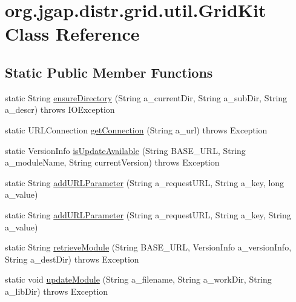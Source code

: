 \hypertarget{classorg_1_1jgap_1_1distr_1_1grid_1_1util_1_1_grid_kit}{\section{org.\-jgap.\-distr.\-grid.\-util.\-Grid\-Kit Class Reference}
\label{classorg_1_1jgap_1_1distr_1_1grid_1_1util_1_1_grid_kit}
}
\subsection*{Static Public Member Functions}
\begin{DoxyCompactItemize}
\item 
static String \hyperlink{classorg_1_1jgap_1_1distr_1_1grid_1_1util_1_1_grid_kit_ad245f01a5b8aa750211ce00883c40872}{ensure\-Directory} (String a\-\_\-current\-Dir, String a\-\_\-sub\-Dir, String a\-\_\-descr)  throws I\-O\-Exception 
\item 
static U\-R\-L\-Connection \hyperlink{classorg_1_1jgap_1_1distr_1_1grid_1_1util_1_1_grid_kit_a8062e8bcddcfc8bc012cdd2cfb15ee52}{get\-Connection} (String a\-\_\-url)  throws Exception 
\item 
static Version\-Info \hyperlink{classorg_1_1jgap_1_1distr_1_1grid_1_1util_1_1_grid_kit_a7ed064739e97dbc91ad4cd11ac736864}{is\-Update\-Available} (String B\-A\-S\-E\-\_\-\-U\-R\-L, String a\-\_\-module\-Name, String current\-Version)  throws Exception 
\item 
static String \hyperlink{classorg_1_1jgap_1_1distr_1_1grid_1_1util_1_1_grid_kit_a7d39c73e9c09a06e3410094b3b8853de}{add\-U\-R\-L\-Parameter} (String a\-\_\-request\-U\-R\-L, String a\-\_\-key, long a\-\_\-value)
\item 
static String \hyperlink{classorg_1_1jgap_1_1distr_1_1grid_1_1util_1_1_grid_kit_ace870d11c157aeceaebc7f6c8790177a}{add\-U\-R\-L\-Parameter} (String a\-\_\-request\-U\-R\-L, String a\-\_\-key, String a\-\_\-value)
\item 
static String \hyperlink{classorg_1_1jgap_1_1distr_1_1grid_1_1util_1_1_grid_kit_a97462ca055f86ee6bb121f879202c0bf}{retrieve\-Module} (String B\-A\-S\-E\-\_\-\-U\-R\-L, Version\-Info a\-\_\-version\-Info, String a\-\_\-dest\-Dir)  throws Exception 
\item 
static void \hyperlink{classorg_1_1jgap_1_1distr_1_1grid_1_1util_1_1_grid_kit_a61d160ee177cb0b07e5e5fda371ad48f}{update\-Module} (String a\-\_\-filename, String a\-\_\-work\-Dir, String a\-\_\-lib\-Dir)  throws Exception 

\end{DoxyCompactItemize}
